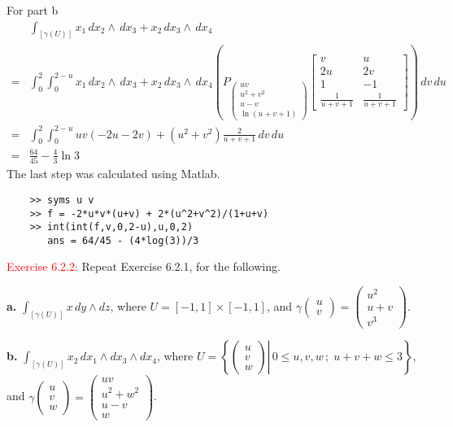 \documentclass[12pt]{article}
\begin{document}
For part b 
\begin{align*}
    &\int_{[\gamma(U)]} x_1\,dx_2 \wedge \,dx_3 +x_2\,dx_3 \wedge \,dx_4 \\
    =& \int_0^2 \int_0^{2-u} x_1\,dx_2 \wedge \,dx_3 +x_2\,dx_3 \wedge \,dx_4
        \left(P_{\begin{pmatrix} uv \\ u^2 + v^2 \\ u-v \\ \ln(u+v+1) \end{pmatrix}}
            \begin{bmatrix}
                v & u \\
                2u & 2v \\
                1 & -1 \\
                \frac{1}{u+v+1} & \frac{1}{u+v+1}
            \end{bmatrix}
        \right) \,dv \,du \\ 
    =& \int_0^2 \int_0^{2-u} uv(-2u-2v) + (u^2+v^2)\frac{2}{u+v+1} \,dv \,du \\
    =& \frac{64}{45} - \frac{4}{3}\ln 3
\end{align*}
The last step was calculated using Matlab.
\begin{verbatim}
    >> syms u v
    >> f = -2*u*v*(u+v) + 2*(u^2+v^2)/(1+u+v)
    >> int(int(f,v,0,2-u),u,0,2)
       ans = 64/45 - (4*log(3))/3
\end{verbatim}
\newpage

\textcolor{red}{Exercise 6.2.2:}
Repeat Exercise 6.2.1, for the following.

\textbf{a.}
$\displaystyle \int_{[\gamma(U)]} x\, dy \wedge dz$, where
$U=[-1,1]\times [-1,1]$, and
$\displaystyle \gamma
\begin{pmatrix}
u\\v
\end{pmatrix} =
\begin{pmatrix}
u^2 \\u+v\\v^3
\end{pmatrix}
$.

\textbf{b.}
$\displaystyle \int_{[\gamma(U)]} x_2\, dx_1 \wedge dx_3 \wedge dx_4$, where
$U= \left\{ \left. \begin{pmatrix}
u\\v\\w
\end{pmatrix}\right| \,
0 \leq u,v,w\, ; \; u+v+w \leq 3
\right\}$, and
$\displaystyle \gamma
\begin{pmatrix}
u\\v\\w
\end{pmatrix} =
\begin{pmatrix}
uv \\u^2+w^2\\u-v\\w
\end{pmatrix}
$.
\end{document}
